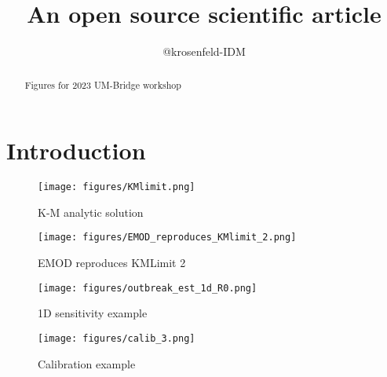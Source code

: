 \documentclass[]{aastex631}
\begin{document}
\title{An open source scientific article}

\author{@krosenfeld-IDM}

\begin{abstract}
    Figures for 2023 UM-Bridge workshop
\end{abstract}

\section{Introduction}
\label{sec:intro}

\begin{figure}
    \begin{centering}
        \texttt{[image: figures/KMlimit.png]}
        \caption{K-M analytic solution}
    \end{centering}
    \label{fig:KMlimit}
\end{figure}

\begin{figure}
    \begin{centering}
        \texttt{[image: figures/EMOD\_reproduces\_KMlimit\_2.png]} 
        \caption{EMOD reproduces KMLimit 2}
    \end{centering}
    \label{fig:Emod-KMLimit}
\end{figure}

\begin{figure}
    \begin{centering}
        \texttt{[image: figures/outbreak\_est\_1d\_R0.png]} 
        \caption{1D sensitivity example}
    \end{centering}
    \label{fig:outbreak_est_1d_R0}
\end{figure}

\begin{figure}
    \begin{centering}
        \texttt{[image: figures/calib\_3.png]} 
        \caption{Calibration example}
    \end{centering}
    \label{fig:calib_3}
\end{figure}
\end{document}
